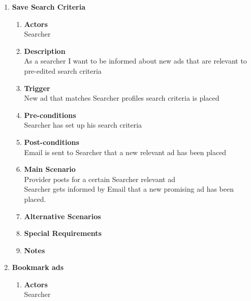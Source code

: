 \documentclass{scrreprt}
\begin{document}
\begin{enumerate}
	\item \textbf{Save Search Criteria}
	\begin{enumerate}
		\item \textbf{Actors}  \\
			Searcher\\

		\item \textbf{Description} \\
			As a searcher I want to be informed about new ads that are relevant to pre-edited search criteria\\
			
		\item \textbf{Trigger} \\
			New ad that matches Searcher profiles search criteria is placed\\

		\item \textbf{Pre-conditions} \\
			Searcher has set up his search criteria\\

		\item \textbf{Post-conditions} \\
			Email is sent to Searcher that a new relevant ad has been placed\\

		\item \textbf{Main Scenario} \\
			Provider posts for a certain Searcher relevant ad\\
			Searcher gets informed by Email that a new promising ad has been placed.\\

		\item \textbf{Alternative Scenarios} \\

		\item \textbf{Special Requirements} \\

		\item \textbf{Notes} \\
	\end{enumerate}

	\item \textbf{Bookmark ads}
	\begin{enumerate}
		\item \textbf{Actors}  \\
			Searcher\\


\end{enumerate}
\end{enumerate}
\end{document}
